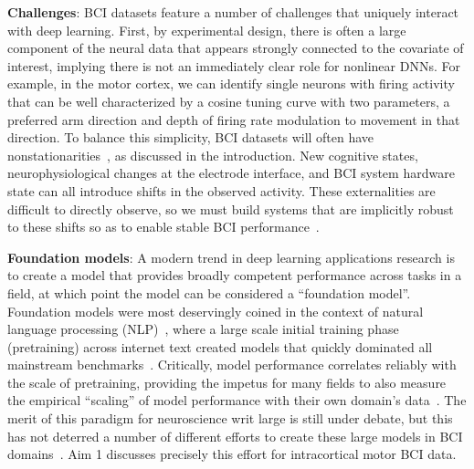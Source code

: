 \documentclass[12pt,oneside]{report}
\begin{document}
\textbf{Challenges}: BCI datasets feature a number of challenges that uniquely interact with deep learning. First, by experimental design, there is often a large component of the neural data that appears strongly connected to the covariate of interest, implying there is not an immediately clear role for nonlinear DNNs. For example, in the motor cortex, we can identify single neurons with firing activity that can be well characterized by a cosine tuning curve with two parameters, a preferred arm direction and depth of firing rate modulation to movement in that direction. To balance this simplicity, BCI datasets will often have nonstationarities~\citep{downey_18_stability,wimalasena2020unstable,perge2013intra}, as discussed in the introduction. New cognitive states, neurophysiological changes at the electrode interface, and BCI system hardware state can all introduce shifts in the observed activity. These externalities are difficult to directly observe, so we must build systems that are implicitly robust to these shifts so as to enable stable BCI performance~\citep{sussillo_16_future}.

\textbf{Foundation models}: A modern trend in deep learning applications research is to create a model that provides broadly competent performance across tasks in a field, at which point the model can be considered a ``foundation model''. Foundation models were most deservingly coined in the context of natural language processing (NLP)~\citep{bommasani2022opportunitiesrisksfoundationmodels}, where a large scale initial training phase (pretraining) across internet text created models that quickly dominated all mainstream benchmarks~\citep{brown2020languagemodelsfewshotlearners}.
Critically, model performance correlates reliably with the scale of pretraining, providing the impetus for many fields to also measure the empirical “scaling” of model performance with their own domain's data~\citep{kaplan2020scaling}.
The merit of this paradigm for neuroscience writ large is still under debate, but this has not deterred a number of different efforts to create these large models in BCI domains~\citep{dyer_richards_2025_bitter_lesson}. Aim 1 discusses precisely this effort for intracortical motor BCI data.
\end{document}
